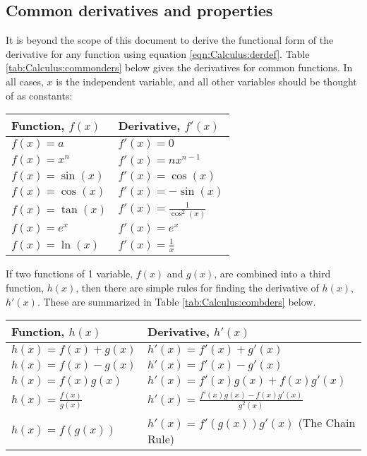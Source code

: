 

\subsection{Common derivatives and properties}
It is beyond the scope of this document to derive the functional form of the derivative for any function using equation \ref{eqn:Calculus:derdef}. Table \ref{tab:Calculus:commonders} below gives the derivatives for common functions. In all cases, $x$ is the independent variable, and all other variables should be thought of as constants:

\begin{center}
\begin{tabular}{l l}
\textbf{Function, $f(x)$} & \textbf{Derivative, $f'(x)$}\\
\hline\hline
$f(x)=a$ & $f'(x)=0$ \\
$f(x)=x^n$ & $f'(x)=nx^{n-1}$ \\
$f(x)=\sin(x)$ & $f'(x)=\cos(x)$ \\
$f(x)=\cos(x)$ & $f'(x)=-\sin(x)$ \\
$f(x)=\tan(x)$ & $f'(x)=\frac{1}{\cos^2(x)}$ \\
$f(x)=e^x$ & $f'(x)=e^x$ \\
$f(x)=\ln(x)$ & $f'(x)=\frac{1}{x}$ \\
\hline
\end{tabular}
\end{center}
If two functions of 1 variable, $f(x)$ and $g(x)$, are combined into a third function, $h(x)$, then there are simple rules for finding the derivative of $h(x)$, $h'(x)$. These are summarized in Table \ref{tab:Calculus:combders} below.
\begin{center}
\begin{tabular}{l l}
\textbf{Function, $h(x)$} & \textbf{Derivative, $h'(x)$}\\
\hline\hline
$h(x)=f(x)+g(x)$ & $h'(x)=f'(x)+g'(x)$ \\
$h(x)=f(x)-g(x)$ & $h'(x)=f'(x)-g'(x)$ \\
$h(x)=f(x)g(x)$ & $h'(x)=f'(x)g(x)+f(x)g'(x)$ \\
$h(x)=\frac{f(x)}{g(x)}$ & $h'(x)=\frac{f'(x)g(x)-f(x)g'(x)}{g^2(x)}$ \\
$h(x)=f(g(x))$ & $h'(x)=f'(g(x))g'(x)$ (The Chain Rule) \\
\hline
\end{tabular}
\end{center}
